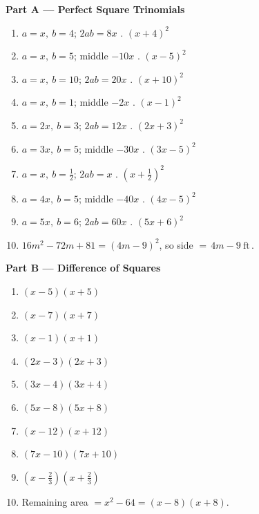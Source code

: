 \documentclass[11pt]{article}
\begin{document}
\noindent\textbf{\textcolor{brandpurple}{Part A --- Perfect Square Trinomials}}
\begin{enumerate}[label=\textbf{A\arabic*.},leftmargin=2.6em,itemsep=5pt]
  \item $a=x,\ b=4$; $2ab=8x$ \checkmark. $\boxed{(x+4)^2}$
  \item $a=x,\ b=5$; middle $-10x$ \checkmark. $\boxed{(x-5)^2}$
  \item $a=x,\ b=10$; $2ab=20x$ \checkmark. $\boxed{(x+10)^2}$
  \item $a=x,\ b=1$; middle $-2x$ \checkmark. $\boxed{(x-1)^2}$
  \item $a=2x,\ b=3$; $2ab=12x$ \checkmark. $\boxed{(2x+3)^2}$
  \item $a=3x,\ b=5$; middle $-30x$ \checkmark. $\boxed{(3x-5)^2}$
  \item $a=x,\ b=\tfrac12$; $2ab=x$ \checkmark. $\boxed{\left(x+\tfrac{1}{2}\right)^2}$
  \item $a=4x,\ b=5$; middle $-40x$ \checkmark. $\boxed{(4x-5)^2}$
  \item $a=5x,\ b=6$; $2ab=60x$ \checkmark. $\boxed{(5x+6)^2}$
  \item $16m^2-72m+81=(4m-9)^2$, so side $=\boxed{\,4m-9\ \text{ft}\,}$.
\end{enumerate}

\medskip
\noindent\textbf{\textcolor{brandteal}{Part B --- Difference of Squares}}
\begin{enumerate}[label=\textbf{B\arabic*.},leftmargin=2.6em,itemsep=5pt]
  \item $\boxed{(x-5)(x+5)}$ \item $\boxed{(x-7)(x+7)}$ \item $\boxed{(x-1)(x+1)}$
  \item $\boxed{(2x-3)(2x+3)}$ \item $\boxed{(3x-4)(3x+4)}$ \item $\boxed{(5x-8)(5x+8)}$
  \item $\boxed{(x-12)(x+12)}$ \item $\boxed{(7x-10)(7x+10)}$
  \item $\boxed{\left(x-\tfrac{2}{3}\right)\left(x+\tfrac{2}{3}\right)}$
  \item Remaining area $=x^2-64=\boxed{(x-8)(x+8)}$.
\end{enumerate}
\end{document}
